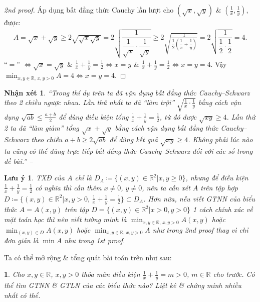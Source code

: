 \documentclass{article}
\newtheorem{baitoan}{}
\newtheorem{luuy}{Lưu ý}
\newtheorem{nhanxet}{Nhận xét}
\begin{document}
\begin{proof}[2nd proof]
	Áp dụng bất đẳng thức Cauchy lần lượt cho $(\sqrt{x},\sqrt{y})$ \& $\left(\frac{1}{x},\frac{1}{y}\right)$, được:
	\begin{align*}
		A = \sqrt{x} + \sqrt{y}\ge2\sqrt{\sqrt{x}\sqrt{y}} = 2\sqrt{\dfrac{1}{\dfrac{1}{\sqrt{x}}\cdot\dfrac{1}{\sqrt{y}}}}\ge2\sqrt{\frac{1}{\dfrac{1}{2}\left(\dfrac{1}{x} + \dfrac{1}{y}\right)}} = 2\sqrt{\dfrac{1}{\dfrac{1}{2}\cdot\dfrac{1}{2}}} = 4.
	\end{align*}
	``$=$'' $\Leftrightarrow \sqrt{x} = \sqrt{y}$ \& $\frac{1}{x} + \frac{1}{y} = \frac{1}{2}\Leftrightarrow x = y$ \& $\frac{1}{x} + \frac{1}{y} = \frac{1}{2}\Leftrightarrow x = y = 4$. Vậy $\min_{x,y\in\mathbb{R},\,x,y > 0} A = 4\Leftrightarrow x = y = 4$.
\end{proof}

\begin{nhanxet}
	``Trong thí dụ trên ta đã vận dụng bất đẳng thức Cauchy--Schwarz theo 2 chiều ngược nhau. Lần thứ nhất ta đã ``làm trội'' $\sqrt{\frac{1}{x}\cdot\frac{1}{y}}$ bằng cách vận dụng $\sqrt{ab}\le\frac{a + b}{2}$ để dùng điều kiện tổng $\frac{1}{x} + \frac{1}{y} = \frac{1}{2}$, từ đó được $\sqrt{xy}\ge4$. Lần thứ 2 ta đã ``làm giảm'' tổng $\sqrt{x} + \sqrt{y}$ bằng cách vận dụng bất đẳng thức Cauchy--Schwarz theo chiều $a + b\ge2\sqrt{ab}$ để dùng kết quả $\sqrt{xy}\ge4$. Không phải lúc nào ta cũng có thể dùng trực tiếp bất đẳng thức Cauchy--Schwarz đối với các số trong đề bài.'' -- \emph{\cite[p. 24]{Tuyen_Toan_9_old}}
\end{nhanxet}

\begin{luuy}
	TXĐ của $A$ chỉ là $D_A\coloneqq\{(x,y)\in\mathbb{R}^2|x,y\ge0\}$, nhưng để điều kiện $\frac{1}{x} + \frac{1}{y} = \frac{1}{2}$ có nghĩa thì cần thêm $x\ne0$, $y\ne0$, nên ta cần xét $A$ trên tập hợp $D\coloneqq\{(x,y)\in\mathbb{R}^2|x,y > 0,\,\frac{1}{x} + \frac{1}{y} = \frac{1}{2}\}\subset D_A$. Hơn nữa, nếu viết {\rm GTNN} của biểu thức $A = A(x,y)$ trên tập $D = \{(x,y)\in\mathbb{R}^2|x > 0,y > 0\}$ 1 cách chính xác về mặt toán học thì nên viết tường minh là $\min_{x,y\in\mathbb{R},\,x,y > 0} A(x,y)$ hoặc $\min_{(x,y)\in D} A(x,y)$ hoặc $\min_{x,y\in\mathbb{R},\,x,y > 0} A$ như trong 2nd proof thay vì chỉ đơn giản là $\min A$ như trong 1st proof.
\end{luuy}
Ta có thể mở rộng \& tổng quát bài toán trên như sau:

\begin{baitoan}
	Cho $x,y\in\mathbb{R}$, $x,y > 0$ thỏa mãn điều kiện $\frac{1}{x} + \frac{1}{y} = m > 0$, $m\in\mathbb{R}$ cho trước. Có thể tìm {\rm GTNN} \& {\rm GTLN} của các biểu thức nào? Liệt kê \& chứng minh nhiều nhất có thể.
\end{baitoan}
\end{document}
